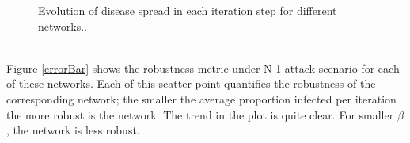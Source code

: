 \documentclass[11pt]{article}
\begin{document}
\begin{figure}[!htb]
\centering
{}
\label{evolution}
\caption{Evolution of disease spread in each iteration step for different networks..}\label{fig:case-39-power-losses}
\end{figure}\\
Figure \ref{errorBar} shows the robustness metric under N-1 attack scenario for each of these networks. Each of this scatter point quantifies the robustness of the corresponding network; the smaller the average proportion infected per iteration the more robust is the network. The trend in the plot is quite clear. For smaller $\beta$, the network is less robust. 
\end{document}
